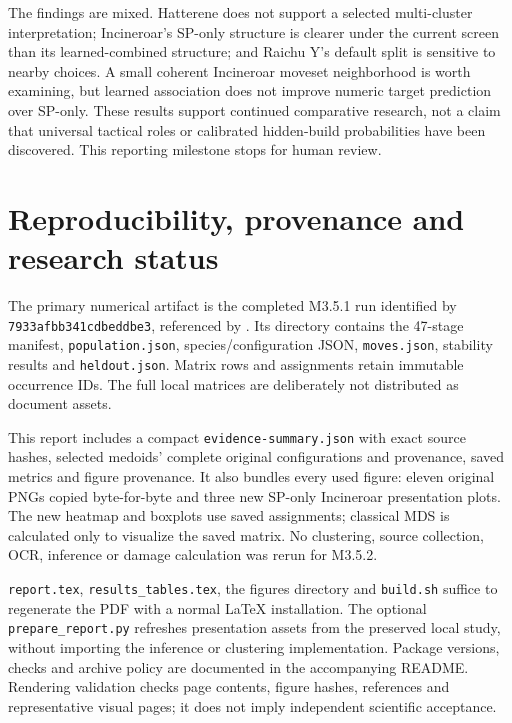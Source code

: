 \documentclass[10pt,a4paper]{article}
\begin{document}
The findings are mixed. Hatterene does not support a selected multi-cluster interpretation; Incineroar's SP-only structure is clearer under the current screen than its learned-combined structure; and Raichu Y's default split is sensitive to nearby choices. A small coherent Incineroar moveset neighborhood is worth examining, but learned association does not improve numeric target prediction over SP-only. These results support continued comparative research, not a claim that universal tactical roles or calibrated hidden-build probabilities have been discovered. This reporting milestone stops for human review.
\clearpage

\section*{Reproducibility, provenance and research status}
The primary numerical artifact is the completed M3.5.1 run identified by \texttt{7933afbb341cdbeddbe3}, referenced by . Its directory contains the 47-stage manifest, \texttt{population.json}, species/configuration JSON, \texttt{moves.json}, stability results and \texttt{heldout.json}. Matrix rows and assignments retain immutable occurrence IDs. The full local matrices are deliberately not distributed as document assets.

This report includes a compact \texttt{evidence-summary.json} with exact source hashes, selected medoids' complete original configurations and provenance, saved metrics and figure provenance. It also bundles every used figure: eleven original PNGs copied byte-for-byte and three new SP-only Incineroar presentation plots. The new heatmap and boxplots use saved assignments; classical MDS is calculated only to visualize the saved matrix. No clustering, source collection, OCR, inference or damage calculation was rerun for M3.5.2.

\texttt{report.tex}, \texttt{results\_tables.tex}, the figures directory and \texttt{build.sh} suffice to regenerate the PDF with a normal LaTeX installation. The optional \texttt{prepare\_report.py} refreshes presentation assets from the preserved local study, without importing the inference or clustering implementation. Package versions, checks and archive policy are documented in the accompanying README. Rendering validation checks page contents, figure hashes, references and representative visual pages; it does not imply independent scientific acceptance.
\end{document}

